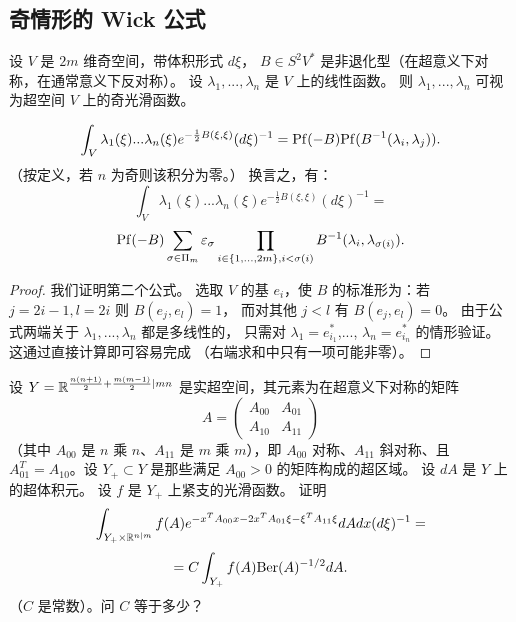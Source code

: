 \subsection{奇情形的 Wick 公式}

设 $V$ 是 $2m$ 维奇空间，带体积形式 $d\xi$，
$B\in S^2V^*$ 是非退化型（在超意义下对称，在通常意义下反对称）。
设 $\lambda_1,...,\lambda_n$ 是 $V$ 上的线性函数。
则 $\lambda_1,...,\lambda_n$ 可视为超空间 $V$ 上的奇光滑函数。
\begin{theorem}\label{wickodd}
$$
\int_V \lambda_1(\xi)...\lambda_n(\xi)e^{-\frac{1}{2}B(\xi,\xi)}(d\xi)^{-1}=
{\rm Pf}(-B){\rm Pf}(B^{-1}(\lambda_i,\lambda_j)).
$$
（按定义，若 $n$ 为奇则该积分为零。）
换言之，有：
$$
\int_V \lambda_1(\xi)...\lambda_n(\xi)e^{-\frac{1}{2}B(\xi,\xi)}(d\xi)^{-1}=
$$
$$
{\rm Pf}(-B)\sum_{\sigma\in \Pi_m}\varepsilon_\sigma
\prod_{i\in \lbrace{1,...,2m\rbrace},
i<\sigma(i)}B^{-1}(\lambda_i,\lambda_{\sigma(i)}).
$$
\end{theorem}

\begin{proof}
我们证明第二个公式。
选取 $V$ 的基 $e_i$，使 $B$ 的标准形为：若
$j=2i-1,l=2i$ 则 $B(e_j,e_l)=1$，
而对其他 $j<l$ 有 $B(e_j,e_l)=0$。
由于公式两端关于 $\lambda_1,...,\lambda_n$ 都是多线性的，
只需对 $\lambda_1=e_{i_1}^*$,...,
$\lambda_n=e_{i_n}^*$ 的情形验证。这通过直接计算即可容易完成
（右端求和中只有一项可能非零）。
\end{proof}


\begin{exercise} 设 $Y=\Bbb R^{\frac{n(n+1)}{2}+\frac{m(m-1)}{2}|mn}$
是实超空间，其元素为在超意义下对称的矩阵 $$
A=\begin{pmatrix} A_{00} & A_{01}\\ A_{10} & A_{11}\end{pmatrix}
$$
（其中 $A_{00}$ 是 $n$ 乘 $n$、$A_{11}$ 是 $m$ 乘 $m$），即 $A_{00}$ 对称、$A_{11}$ 斜对称、且 $A_{01}^T=A_{10}$。设
$Y_+\subset Y$ 是那些满足
$A_{00}>0$ 的矩阵构成的超区域。
设 $dA$ 是 $Y$ 上的超体积元。
设 $f$ 是 $Y_+$ 上紧支的光滑函数。
证明
$$
\int_{Y_+\times \Bbb R^{n|m}}
f(A)e^{-x^TA_{00}x-2x^TA_{01}\xi-\xi^TA_{11}\xi}dAdx(d\xi)^{-1}
=
$$
$$
=C\int_{Y_+}f(A){\rm Ber}(A)^{-1/2}dA.
$$
（$C$ 是常数）。问 $C$ 等于多少？
\end{exercise}

